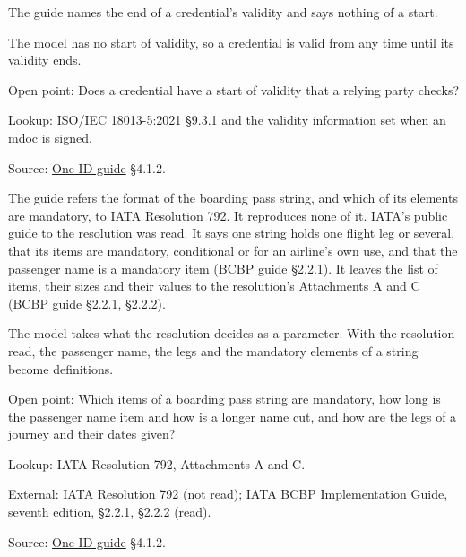\begin{definition}
  \label{def:c98}
  \notready
  The guide names the end of a credential's validity and says nothing of a
  start.

  The model has no start of validity, so a credential is valid from any time
  until its validity ends.

  Open point: Does a credential have a start of validity that a relying party
  checks?

  Lookup: ISO/IEC 18013-5:2021 §9.3.1 and the validity information set when
  an mdoc is signed.

  Source:
  \href{https://standards.atlassian.net/wiki/spaces/OneID/pages/2947416082/Technical+Implementation+Guide}{One
  ID guide} §4.1.2.
\end{definition}

\begin{definition}
  \label{def:c102}
  \notready
  The guide refers the format of the boarding pass string, and which of its
  elements are mandatory, to IATA Resolution 792. It reproduces none of it.
  IATA's public guide to the resolution was read. It says one string holds
  one flight leg or several, that its items are mandatory, conditional or for
  an airline's own use, and that the passenger name is a mandatory item (BCBP
  guide §2.2.1). It leaves the list of items, their sizes and their values to
  the resolution's Attachments A and C (BCBP guide §2.2.1, §2.2.2).

  The model takes what the resolution decides as a parameter. With the
  resolution read, the passenger name, the legs and the mandatory elements of
  a string become definitions.

  Open point: Which items of a boarding pass string are mandatory, how long is
  the passenger name item and how is a longer name cut, and how are the legs
  of a journey and their dates given?

  Lookup: IATA Resolution 792, Attachments A and C.

  External: IATA Resolution 792 (not read); IATA BCBP Implementation Guide,
  seventh edition, §2.2.1, §2.2.2 (read).

  Source:
  \href{https://standards.atlassian.net/wiki/spaces/OneID/pages/2947416082/Technical+Implementation+Guide}{One
  ID guide} §4.1.2.
\end{definition}

